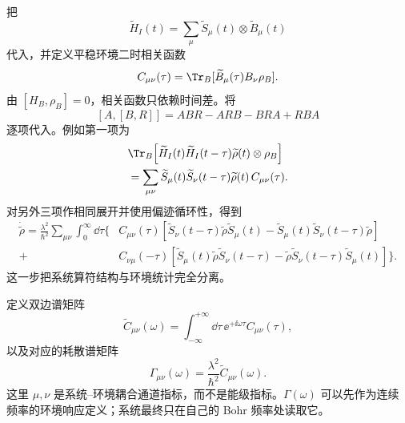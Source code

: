 把
\[
\widetilde H_I(t)
=\sum_\mu\widetilde S_\mu(t)\otimes\widetilde B_\mu(t)
\]
代入，并定义平稳环境二时相关函数
\begin{equation}
C_{\mu\nu}(\tau)
=\Tr_B[\widetilde B_\mu(\tau)B_\nu\rho_B].
\label{eq:phys-oqs-bath-correlation}
\end{equation}
由 $[H_B,\rho_B]=0$，相关函数只依赖时间差。将
\[
[A,[B,R]]=ABR-ARB-BRA+RBA
\]
逐项代入。例如第一项为
\[
\begin{aligned}
&\Tr_B\!\left[
\widetilde H_I(t)\widetilde H_I(t-\tau)
\widetilde\rho(t)\otimes\rho_B
\right]\\
&=\sum_{\mu\nu}
\widetilde S_\mu(t)\widetilde S_\nu(t-\tau)
\widetilde\rho(t)\,
C_{\mu\nu}(\tau).
\end{aligned}
\]
对另外三项作相同展开并使用偏迹循环性，得到
\begin{equation}
\begin{aligned}
\dot{\widetilde\rho}
=\frac{\lambda^2}{\hbar^2}
\sum_{\mu\nu}\int_0^\infty\dd\tau\Big\{&
C_{\mu\nu}(\tau)
[\widetilde S_\nu(t-\tau)\widetilde\rho\widetilde S_\mu(t)
-\widetilde S_\mu(t)\widetilde S_\nu(t-\tau)\widetilde\rho]\\
+&C_{\nu\mu}(-\tau)
[\widetilde S_\mu(t)\widetilde\rho\widetilde S_\nu(t-\tau)
-\widetilde\rho\widetilde S_\nu(t-\tau)\widetilde S_\mu(t)]
\Big\}.
\end{aligned}
\label{eq:phys-oqs-bm-correlation-form}
\end{equation}
这一步把系统算符结构与环境统计完全分离。

定义双边谱矩阵
\begin{equation}
\widetilde C_{\mu\nu}(\omega)
=\int_{-\infty}^{+\infty}\dd\tau\,
\ee^{+\ii\omega\tau}C_{\mu\nu}(\tau),
\label{eq:phys-oqs-two-sided-spectrum}
\end{equation}
以及对应的耗散谱矩阵
\begin{equation}
\Gamma_{\mu\nu}(\omega)
=\frac{\lambda^2}{\hbar^2}
\widetilde C_{\mu\nu}(\omega).
\label{eq:phys-oqs-gamma-from-spectrum}
\end{equation}
这里 $\mu,\nu$ 是系统--环境耦合通道指标，而不是能级指标。$\Gamma(\omega)$ 可以先作为连续频率的环境响应定义；系统最终只在自己的 Bohr 频率处读取它。

